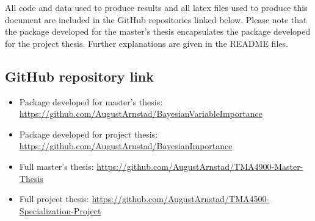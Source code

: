 All code and data used to produce results and all latex files used to produce this document are included in the GitHub repositories linked below. Please note that the package developed for the master's thesis encapsulates the package developed for the project thesis. Further explanations are given in the README files. 
\subsection*{GitHub repository link}
\begin{itemize}
    \item Package developed for master's thesis: \url{https://github.com/AugustArnstad/BayesianVariableImportance}
    \item Package developed for project thesis: \url{https://github.com/AugustArnstad/BayesianImportance}
    \item Full master's thesis: \url{https://github.com/AugustArnstad/TMA4900-Master-Thesis}
    \item Full project thesis: \url{https://github.com/AugustArnstad/TMA4500-Specialization-Project}
\end{itemize}
